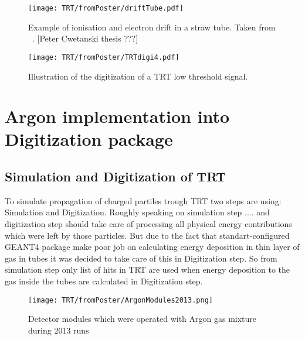 \begin{figure}
\begin{center}
 \texttt{[image: TRT/fromPoster/driftTube.pdf]}
\caption{\label{fig:clusterDriftInTube} Example of ionisation and electron drift in a straw tube. Taken from ~\cite{Cwetanski:962570}. 
	  [Peter Cwetanski thesis ???]}
\end{center}
\end{figure}

\begin{figure}
\begin{center}
 \texttt{[image: TRT/fromPoster/TRTdigi4.pdf]}
\caption{\label{fig:pulseDigitization} Illustration of the digitization of a TRT low threshold signal.}
\end{center}
\end{figure}



\section{Argon implementation into Digitization package}
\label{sec:TRT:argonImpl}


\subsection{Simulation and Digitization of TRT}

To simulate propagation of charged partiles trough TRT two steps are using: Simulation and Digitization. 
Roughly speaking on simulation step .... and digitization step should take care of processing all physical energy contributions which were left by those particles.
But due to the fact that standart-configured GEANT4 package make poor job on calculating energy deposition in thin layer of gas in tubes it was decided to take care 
of this in Digitization step. So from simulation step only list of hits in TRT are used when energy deposition to the gas inside the tubes are calculated in Digitization step.


\begin{figure}
\begin{center}
 \texttt{[image: TRT/fromPoster/ArgonModules2013.png]}
\caption{\label{fig:argonModulesIn2013} Detector modules which were operated with Argon gas mixture during 2013 runs}
\end{center}
\end{figure}





